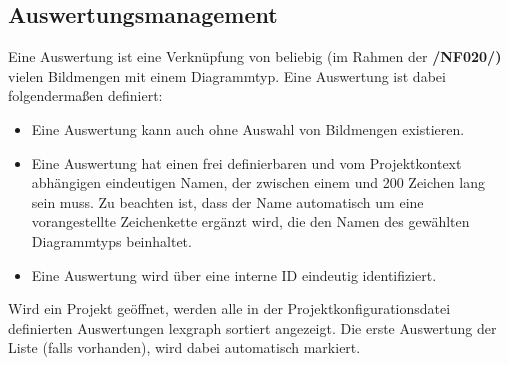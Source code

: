 \subsection{Auswertungsmanagement}

\label{subsec:auswertungsmgmt}

	Eine Auswertung ist eine Verknüpfung von beliebig (im Rahmen der \textbf{/NF020/)} vielen Bildmengen mit einem Diagrammtyp. Eine Auswertung ist dabei folgendermaßen definiert:

	\begin{itemize}

		\item Eine Auswertung kann auch ohne Auswahl von Bildmengen existieren. 

		\item Eine Auswertung hat einen frei definierbaren und vom Projektkontext abhängigen eindeutigen Namen, der zwischen einem und 200 Zeichen lang sein muss. Zu beachten ist, dass der Name automatisch um eine vorangestellte Zeichenkette ergänzt wird, die den Namen des gewählten Diagrammtyps beinhaltet.

		\item Eine Auswertung wird über eine interne ID eindeutig identifiziert.

	\end{itemize}

	Wird ein Projekt geöffnet, werden alle in der Projektkonfigurationsdatei definierten Auswertungen \gls{lexgraph} sortiert angezeigt. Die erste Auswertung der Liste (falls vorhanden), wird dabei automatisch markiert.

